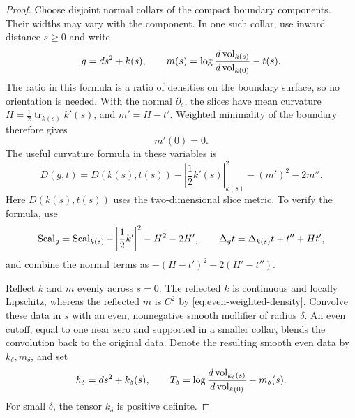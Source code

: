 \begin{proof}
Choose disjoint normal collars of the compact boundary components.  Their
widths may vary with the component.  In one such collar, use inward
distance $s\ge0$ and write
\begin{equation}\label{eq:weighted-collar-data}
 g=ds^2+k(s),\qquad
 m(s)=\log\frac{d\operatorname{vol}_{k(s)}}{d\operatorname{vol}_{k(0)}}-t(s).
\end{equation}
The ratio in this formula is a ratio of densities on the boundary
surface, so no orientation is needed.  With the normal $\partial_s$,
the slices have mean curvature
$H=\frac12\operatorname{tr}_{k(s)}k'(s)$, and
$m'=H-t'$.  Weighted minimality of the boundary therefore gives
\begin{equation}\label{eq:even-weighted-density}
 m'(0)=0.
\end{equation}
The useful curvature formula in these variables is
\begin{equation}\label{eq:collar-curvature}
 D(g,t)=D(k(s),t(s))
       -\left|\frac12k'(s)\right|_{k(s)}^2-(m')^2-2m''.
\end{equation}
Here $D(k(s),t(s))$ uses the two-dimensional slice metric.  To verify the
formula, use
\[
 \operatorname{Scal}_g=\operatorname{Scal}_{k(s)}-\left|\frac12k'\right|^2-H^2-2H',
 \qquad
 \Delta_g t=\Delta_{k(s)}t+t''+Ht',
\]
and combine the normal terms as
$-(H-t')^2-2(H'-t'')$.

Reflect $k$ and $m$ evenly across $s=0$.  The reflected $k$ is continuous
and locally Lipschitz, whereas the reflected $m$ is $C^2$ by
\eqref{eq:even-weighted-density}.  Convolve these data in $s$ with an even,
nonnegative smooth mollifier of radius $\delta$.  An even cutoff, equal
to one near zero and supported in a smaller collar, blends the
convolution back to the original data.  Denote the resulting smooth
even data by $k_\delta,m_\delta$, and set
\[
 h_\delta=ds^2+k_\delta(s),\qquad
 T_\delta=\log\frac{d\operatorname{vol}_{k_\delta(s)}}{d\operatorname{vol}_{k(0)}}-m_\delta(s).
\]
For small $\delta$, the tensor $k_\delta$ is positive definite.


\end{proof}
